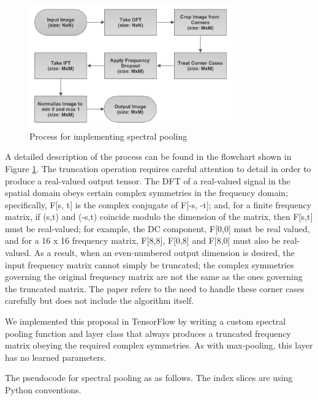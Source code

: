 \documentclass[10pt,journal,compsoc]{IEEEtran}
\begin{document}
\begin{figure}[ht]
\centering
  \includegraphics[width=250pt]{images/fc_spectral_pool.png}
  \caption{Process for implementing spectral pooling}
  \label{fig:spec_pool}
\end{figure}

A detailed description of the process can be found in the flowchart shown in Figure \ref{fig:spec_pool}. The truncation operation requires careful attention to detail in order to produce a real-valued output tensor. The DFT of a real-valued signal in the spatial domain obeys certain complex symmetries in the frequency domain; specifically, F[s, t] is the complex conjugate of F[-s, -t]; and, for a finite frequency matrix, if (s,t) and (-s,t) coincide modulo the dimension of the matrix, then F[s,t] must be real-valued; for example, the DC component, F[0,0] must be real valued, and for a 16 x 16 frequency matrix, F[8,8], F[0,8] and F[8,0] must also be real-valued. As a result, when an even-numbered output dimension is desired, the input frequency matrix cannot simply be truncated; the complex symmetries governing the original frequency matrix are not the same as the ones governing the truncated matrix. The paper refers to the need to handle these corner cases carefully but does not include the algorithm itself.

We implemented this proposal in TensorFlow by writing a custom spectral pooling function and layer class that always produces a truncated frequency matrix obeying the required complex symmetries. As with max-pooling, this layer has no learned parameters.

The pseudocode for spectral pooling as as follows. The index slices are using Python conventions.
\end{document}
